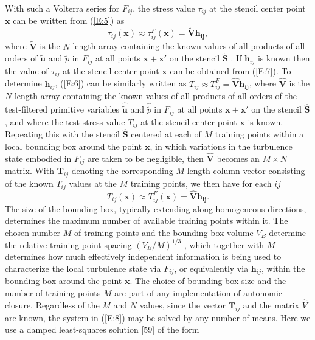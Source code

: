 With such a Volterra series for $F_{ij}$, the stress value $\tau_{ij}$   at the stencil center point $\mathbf{x}$ can be written from (\ref{E:5}) as
%
\begin{equation}
	\label{E:7}
	\tau_{ij}(\mathbf{x}) \approx  \tau_{ij}^{F}(\mathbf{x})
	= \mathbf{\widetilde{V}h_{ij}}, 
\end{equation}
%
%         
where $\widetilde{\mathbf{V}}$  is the $N$-length array containing the known values of all products of all orders of   $\widetilde{\mathbf{u}}$  and $\widetilde{p}$   in $F_{ij}$  at all points $\mathbf{x} +\mathbf{x'} $  on the stencil $\widetilde{\mathbf{S}}$  . If $\mathbf{h}_{ij}$  is known then the value of  $\tau_{ij}$ at the stencil center point $\mathbf{x}$ can be obtained from (\ref{E:7}). To determine  $\mathbf{h}_{ij}$, (\ref{E:6}) can be similarly written as $T_{ij} \approx T_{ij}^{F} = \mathbf{\widehat{V}h_{ij}}$, where $\mathbf{\widehat{V}}$  is the $N$-length array containing the known values of all products of all orders of the test-filtered primitive variables  $\widehat{\widetilde{\mathbf{u}}}$  and  $\widehat{{\widetilde{p}}}$   in  $F_{ij}$ at all points $\mathbf{x} +\mathbf{x'} $  on the stencil $\widehat{\mathbf{S}}$, and where the test stress value $T_{ij}$   at the stencil center point $\mathbf{x}$ is known. Repeating this with the stencil ${\widehat{\mathbf{S}}}$  centered at each of $M$ training points within a local bounding box around the point $\mathbf{x}$, in which variations in the turbulence state embodied in  $F_{ij}$ are taken to be negligible, then $\mathbf{\widehat{V}}$   becomes an  $M \times N$ matrix. With $\mathbf{T}_{ij}$  denoting the corresponding $M$-length column vector consisting of the known  $T_{ij}$ values at the $M$ training points, we then have for each $ij$
%
\begin{equation}
	\label{E:8}
	T_{ij}(\mathbf{x}) \approx  T_{ij}^{F}(\mathbf{x})
	= \mathbf{\widehat{V}h_{ij}}.
\end{equation}
%
%      
The size of the bounding box, typically extending along homogeneous directions, determines the maximum number of available training points within it. The chosen number $M$ of training points and the bounding box volume $V_B$  determine the relative training point spacing $(V_B/M)^{1/3}$  , which together with $M$ determines how much effectively independent information is being used to characterize the local turbulence state via $F_{ij}$, or equivalently via $\mathbf{h}_{ij}$, within the bounding box around the point $\mathbf{x}$. The choice of bounding box size and the number of training points $M$ are part of any implementation of autonomic closure. Regardless of the $M$ and $N$ values, since the vector  $\mathbf{T}_{ij}$ and the matrix $\widehat{V}$   are known, the system in (\ref{E:8}) may be solved by any number of means. Here we use a damped least-squares solution [59] of the form
